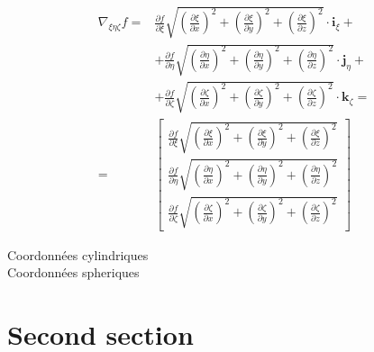 \documentclass
[
a4paper,                      %
twoside,					  %
12pt,                         %
abstract,		      %
fleqn,                        %
]
{scrartcl} %
\begin{document}
\begin{equation}
\begin{aligned}
\nabla_{\xi\eta\zeta} f=&\frac{\partial f}{\partial\xi}\sqrt{\left(\frac{\partial\xi}{\partial x}\right)^{2}+\left(\frac{\partial\xi}{\partial y}\right)^{2}+\left(\frac{\partial\xi}{\partial z}\right)^{2}}\cdot\mathbf{i}_{\xi}+\\
&+\frac{\partial f}{\partial\eta}\sqrt{\left(\frac{\partial\eta}{\partial x}\right)^{2}+\left(\frac{\partial\eta}{\partial y}\right)^{2}+\left(\frac{\partial\eta}{\partial z}\right)^{2}}\cdot\mathbf{j}_{\eta}+\\
&+\frac{\partial f}{\partial\zeta}\sqrt{\left(\frac{\partial\zeta}{\partial x}\right)^{2}+\left(\frac{\partial\zeta}{\partial y}\right)^{2}+\left(\frac{\partial\zeta}{\partial z}\right)^{2}}\cdot\mathbf{k}_{\zeta}=\\
=&\begin{bmatrix}
\frac{\partial f}{\partial\xi}\sqrt{\left(\frac{\partial\xi}{\partial x}\right)^{2}+\left(\frac{\partial\xi}{\partial y}\right)^{2}+\left(\frac{\partial\xi}{\partial z}\right)^{2}}\\[10pt]
\frac{\partial f}{\partial\eta}\sqrt{\left(\frac{\partial\eta}{\partial x}\right)^{2}+\left(\frac{\partial\eta}{\partial y}\right)^{2}+\left(\frac{\partial\eta}{\partial z}\right)^{2}}\\[10pt]
\frac{\partial f}{\partial\zeta}\sqrt{\left(\frac{\partial\zeta}{\partial x}\right)^{2}+\left(\frac{\partial\zeta}{\partial y}\right)^{2}+\left(\frac{\partial\zeta}{\partial z}\right)^{2}}
\end{bmatrix}
\end{aligned}
\end{equation}

\begin{description}
\item[Coordonn\'ees cylindriques]

\item[Coordonn\'ees spheriques]
\end{description}


\clearscrheadings
\pagestyle{scrheadings}
\manualmark
\ofoot{\\\pagemark} %
\ifoot{} %
\setheadtopline{2pt}
\setheadsepline{0.5pt}
\setfootsepline{0.5pt}

\section{Second section}
\end{document}
